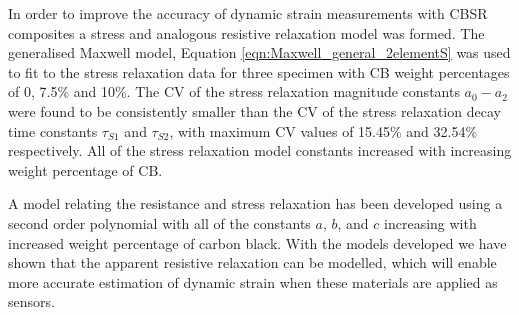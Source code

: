 In order to improve the accuracy of dynamic strain measurements with CBSR composites a stress and analogous resistive relaxation model was formed. The generalised Maxwell model, Equation \ref{eqn:Maxwell_general_2elementS} was used to fit to the stress relaxation data for three specimen with CB weight percentages of 0, 7.5\% and 10\%. The CV of the stress relaxation magnitude constants $a_0-a_2$ were found to be consistently smaller than the CV of the stress relaxation decay time constants $\tau_{S1}$ and $\tau_{S2}$, with maximum CV values of 15.45\% and 32.54\% respectively. All of the stress relaxation model constants increased with increasing weight percentage of CB.


A model relating the resistance and stress relaxation has been developed using a second order polynomial with all of the constants $a$, $b$, and $c$ increasing with increased weight percentage of carbon black. With the models developed we have shown that the apparent resistive relaxation can be modelled, which will enable more accurate estimation of dynamic strain when these materials are applied as sensors. 




